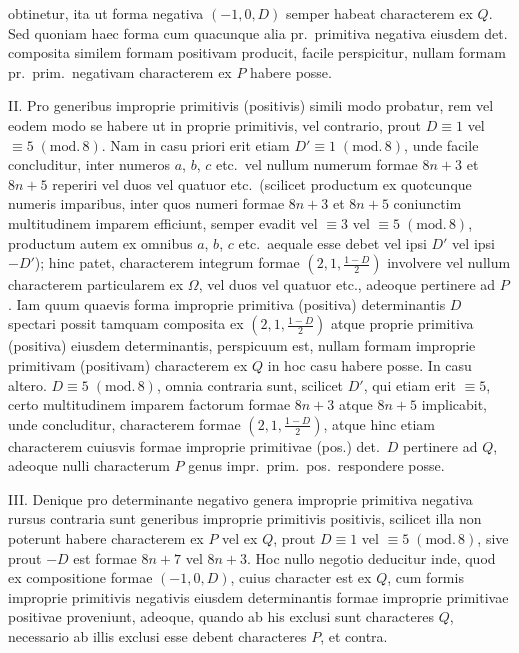 obtinetur, ita ut forma negativa $(-1, 0, D)$ semper habeat characterem ex $Q$.
Sed quoniam haec forma cum quacunque alia pr.\ primitiva negativa eiusdem det.
composita similem formam positivam producit, facile perspicitur, nullam formam
pr.\ prim.\ negativam characterem ex $P$ habere posse.

II. Pro generibus improprie primitivis (positivis) simili modo probatur, rem
vel eodem modo se habere ut in proprie primitivis, vel contrario, prout $D\equiv1$
vel $\equiv5\;(\mathrm{mod.}\,8)$. Nam in casu priori erit etiam $D'\equiv1\;(\mathrm{mod.}\,8)$, unde facile
concluditur, inter numeros $a$, $b$, $c$ etc.\ vel nullum numerum formae $8n+3$ et
$8n+5$ reperiri vel duos vel quatuor etc.\ (scilicet productum ex quotcunque
numeris imparibus, inter quos numeri formae $8n+3$ et $8n+5$ coniunctim
multitudinem imparem efficiunt, semper evadit vel $\equiv3$ vel $\equiv5\;(\mathrm{mod.}\,8)$, productum
autem ex omnibus $a$, $b$, $c$ etc.\ aequale esse debet vel ipsi $D'$ vel ipsi $-D'$); hinc
patet, characterem integrum formae $(2, 1, \frac{1-D}{2})$ involvere vel nullum characterem
particularem ex $\Omega$, vel duos vel quatuor etc., adeoque pertinere ad $P$. Iam
quum quaevis forma improprie primitiva (positiva) determinantis $D$ spectari possit
tamquam composita ex $(2, 1, \frac{1-D}{2})$ atque proprie primitiva (positiva) eiusdem
determinantis, perspicuum est, nullam formam improprie primitivam (positivam)
characterem ex $Q$ in hoc casu habere posse. In casu altero. $D\equiv5\;(\mathrm{mod.}\,8)$,
omnia contraria sunt, scilicet $D'$, qui etiam erit $\equiv5$, certo multitudinem
imparem factorum formae $8n+3$ atque $8n+5$ implicabit, unde concluditur,
characterem formae $(2, 1, \frac{1-D}{2})$, atque hinc etiam characterem cuiusvis formae
improprie primitivae (pos.) det.\ $D$ pertinere ad $Q$, adeoque nulli characterum
$P$ genus impr.\ prim.\ pos.\ respondere posse.

III. Denique pro determinante negativo genera improprie primitiva
negativa rursus contraria sunt generibus improprie primitivis positivis, scilicet illa non
poterunt habere characterem ex $P$ vel ex $Q$, prout $D\equiv1$ vel $\equiv5\;(\mathrm{mod.}\,8)$,
sive prout $-D$ est formae $8n+7$ vel $8n+3$. Hoc nullo negotio deducitur
inde, quod ex compositione formae $(-1, 0, D)$, cuius character est ex $Q$, cum
formis improprie primitivis negativis eiusdem determinantis formae improprie
primitivae positivae proveniunt, adeoque, quando ab his exclusi sunt characteres $Q$,
necessario ab illis exclusi esse debent characteres $P$, et contra.

